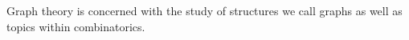 Graph theory is concerned with the study of structures we call graphs as well as topics within combinatorics.


